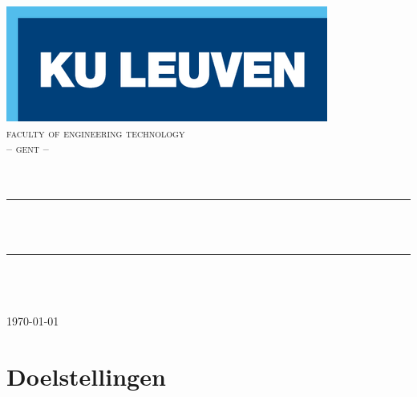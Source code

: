 \documentclass[11pt,a4paper,twoside]{article} %
\begin{document}

\begin{titlepage}																			
	\newcommand{\HRule}{\rule{\linewidth}{0.5mm}} %

	\center{} %

	\includegraphics[scale=0.55]{img/logo_kuleuven.png}\\
	\textsc{\large faculty of engineering technology\\-- gent --}\\[2cm]

	\textsc{\LARGE \MakeUppercase{\mycourse}}\\[0.25cm] %
	\textsc{\Large \MakeLowercase{\mysubtitle}}\\[0.25cm] %

	\HRule \\[0.7cm] %
	{ \huge \bfseries \mytitle}	\\[0.4cm] %
	\HRule \\[1.4cm] %

	\Large \myauthor \\[0.4cm] %
	\large \myclass
	\\[1.4cm]

	{\Large \today }\\[1.4cm] %

\end{titlepage}



\tableofcontents
\vspace{1cm}



\section{Doelstellingen}
\end{document}
